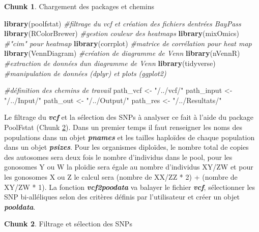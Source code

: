 \documentclass[
  openany]{book}
\newenvironment{Shaded}{\begin{snugshade}}{\end{snugshade}}
\newcommand{\CommentTok}[1]{\textcolor[rgb]{0.56,0.35,0.01}{\textit{#1}}}
\newcommand{\FunctionTok}[1]{\textcolor[rgb]{0.13,0.29,0.53}{\textbf{#1}}}
\newcommand{\NormalTok}[1]{#1}
\newcommand{\OtherTok}[1]{\textcolor[rgb]{0.56,0.35,0.01}{#1}}
\newcommand{\StringTok}[1]{\textcolor[rgb]{0.31,0.60,0.02}{#1}}
\theoremstyle{definition}
\theoremstyle{definition}
\theoremstyle{definition}
\newtheorem{exercise}{Chunk}[chapter]
\theoremstyle{definition}
\theoremstyle{remark}
\begin{document}
\begin{exercise}
\protect\hypertarget{exr:chunk1}{}\label{exr:chunk1}{Chargement des packages et chemins}
\end{exercise}

\begin{Shaded}
\begin{Highlighting}[]
\FunctionTok{library}\NormalTok{(poolfstat)      }\CommentTok{\#filtrage du vcf et création des fichiers d\textquotesingle{}entrées BayPass}
\FunctionTok{library}\NormalTok{(RColorBrewer)   }\CommentTok{\#gestion couleur des heatmaps}
\FunctionTok{library}\NormalTok{(mixOmics)       }\CommentTok{\#"cim" pour heatmap}
\FunctionTok{library}\NormalTok{(corrplot)       }\CommentTok{\#matrice de corrélation pour heat map}
\FunctionTok{library}\NormalTok{(VennDiagram)    }\CommentTok{\#création de diagramme de Venn}
\FunctionTok{library}\NormalTok{(nVennR)         }\CommentTok{\#extraction de données d\textquotesingle{}un diagramme de Venn}
\FunctionTok{library}\NormalTok{(tidyverse)      }\CommentTok{\#manipulation de données (dplyr) et plots (ggplot2)}

\CommentTok{\#définition des chemins de travail}
\NormalTok{path\_vcf }\OtherTok{\textless{}{-}} \StringTok{"/../vcf/"}
\NormalTok{path\_input }\OtherTok{\textless{}{-}} \StringTok{"/../Input/"}
\NormalTok{path\_out }\OtherTok{\textless{}{-}} \StringTok{"/../Output/"}
\NormalTok{path\_res }\OtherTok{\textless{}{-}} \StringTok{"/../Resultats/"}
\end{Highlighting}
\end{Shaded}

Le filtrage du \textbf{\emph{vcf}} et la sélection des SNPs à analyser ce fait à l'aide du package PoolFstat (Chunk \ref{exr:chunk2}). Dans un premier temps il faut renseigner les noms des populations dans un objet \textbf{\emph{pnames}} et les tailles haploïdes de chaque population dans un objet \textbf{\emph{psizes}}. Pour les organismes diploïdes, le nombre total de copies des autosomes sera deux fois le nombre d'individus dans le pool, pour les gonosomes Y ou W la ploïdie sera égale au nombre d'individus XY/ZW et pour les gonosomes X ou Z le calcul sera (nombre de XX/ZZ * 2) + (nombre de XY/ZW * 1).
La fonction \textbf{\emph{vcf2poodata}} va balayer le fichier \textbf{\emph{vcf}}, sélectionner les SNP bi-alléliques selon des critères définis par l'utilisateur et créer un objet \textbf{\emph{pooldata}}.

\begin{exercise}
\protect\hypertarget{exr:chunk2}{}\label{exr:chunk2}{Filtrage et sélection des SNPs}
\end{exercise}
\end{document}
